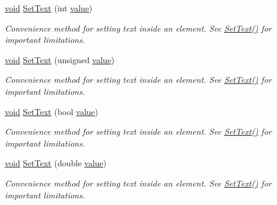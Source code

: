 \begin{DoxyCompactItemize}
\hyperlink{interfacevoid}{void} \hyperlink{classtinyxml2_1_1_x_m_l_element_aeae8917b5ea6060b3c08d4e3d8d632d7}{Set\+Text} (int \hyperlink{unionvalue}{value})
\begin{DoxyCompactList}\small\item\em Convenience method for setting text inside an element. See \hyperlink{classtinyxml2_1_1_x_m_l_element_a1f9c2cd61b72af5ae708d37b7ad283ce}{Set\+Text()} for important limitations. \end{DoxyCompactList}\item 
\mbox{\label{classtinyxml2_1_1_x_m_l_element_a7bbfcc11d516598bc924a8fba4d08597}} 
\hyperlink{interfacevoid}{void} \hyperlink{classtinyxml2_1_1_x_m_l_element_a7bbfcc11d516598bc924a8fba4d08597}{Set\+Text} (unsigned \hyperlink{unionvalue}{value})
\begin{DoxyCompactList}\small\item\em Convenience method for setting text inside an element. See \hyperlink{classtinyxml2_1_1_x_m_l_element_a1f9c2cd61b72af5ae708d37b7ad283ce}{Set\+Text()} for important limitations. \end{DoxyCompactList}\item 
\mbox{\label{classtinyxml2_1_1_x_m_l_element_ae4b543d6770de76fb6ab68e541c192a4}} 
\hyperlink{interfacevoid}{void} \hyperlink{classtinyxml2_1_1_x_m_l_element_ae4b543d6770de76fb6ab68e541c192a4}{Set\+Text} (bool \hyperlink{unionvalue}{value})
\begin{DoxyCompactList}\small\item\em Convenience method for setting text inside an element. See \hyperlink{classtinyxml2_1_1_x_m_l_element_a1f9c2cd61b72af5ae708d37b7ad283ce}{Set\+Text()} for important limitations. \end{DoxyCompactList}\item 
\mbox{\label{classtinyxml2_1_1_x_m_l_element_a67bd77ac9aaeff58ff20b4275a65ba4e}} 
\hyperlink{interfacevoid}{void} \hyperlink{classtinyxml2_1_1_x_m_l_element_a67bd77ac9aaeff58ff20b4275a65ba4e}{Set\+Text} (double \hyperlink{unionvalue}{value})
\begin{DoxyCompactList}\small\item\em Convenience method for setting text inside an element. See \hyperlink{classtinyxml2_1_1_x_m_l_element_a1f9c2cd61b72af5ae708d37b7ad283ce}{Set\+Text()} for important limitations. \end{DoxyCompactList}\item 

\end{DoxyCompactItemize}

